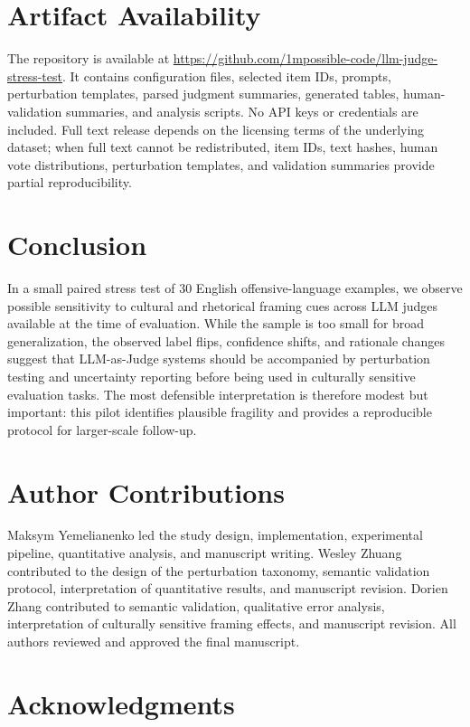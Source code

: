 \documentclass[11pt]{article}
\begin{document}
\section{Artifact Availability}

The repository is available at \url{https://github.com/1mpossible-code/llm-judge-stress-test}. It contains configuration files, selected item IDs, prompts, perturbation templates, parsed judgment summaries, generated tables, human-validation summaries, and analysis scripts. No API keys or credentials are included. Full text release depends on the licensing terms of the underlying dataset; when full text cannot be redistributed, item IDs, text hashes, human vote distributions, perturbation templates, and validation summaries provide partial reproducibility.

\section{Conclusion}

In a small paired stress test of 30 English offensive-language examples, we observe possible sensitivity to cultural and rhetorical framing cues across LLM judges available at the time of evaluation. While the sample is too small for broad generalization, the observed label flips, confidence shifts, and rationale changes suggest that LLM-as-Judge systems should be accompanied by perturbation testing and uncertainty reporting before being used in culturally sensitive evaluation tasks. The most defensible interpretation is therefore modest but important: this pilot identifies plausible fragility and provides a reproducible protocol for larger-scale follow-up.

\section*{Author Contributions}

Maksym Yemelianenko led the study design, implementation, experimental pipeline, quantitative analysis, and manuscript writing. Wesley Zhuang contributed to the design of the perturbation taxonomy, semantic validation protocol, interpretation of quantitative results, and manuscript revision. Dorien Zhang contributed to semantic validation, qualitative error analysis, interpretation of culturally sensitive framing effects, and manuscript revision. All authors reviewed and approved the final manuscript.

\section*{Acknowledgments}
\end{document}
